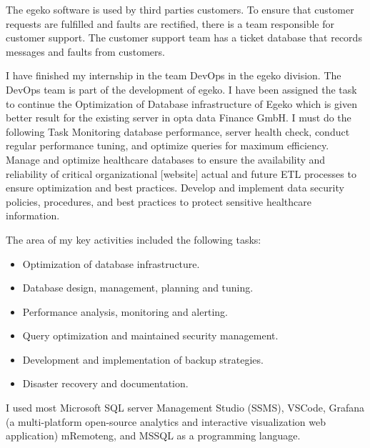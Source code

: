 The egeko software is used by third parties  customers. To ensure that customer requests are fulfilled and faults are rectified, there is a team responsible for customer support. The customer support team has a ticket database that records messages and faults from customers.\vspace{.4cm}

I have finished my internship in the team DevOps in the egeko division. The DevOps team is part of the development of egeko. I have been assigned the task to continue the Optimization of Database infrastructure of Egeko which is given better result for the existing server in opta data Finance GmbH. I must do the following Task Monitoring database performance, server health check, conduct regular performance tuning, and optimize queries for maximum efficiency. Manage and optimize healthcare databases to ensure the availability and reliability of critical organizational [website] actual and future ETL processes to ensure optimization and best practices. Develop and implement data security policies, procedures, and best practices to protect sensitive healthcare information.\vspace{.4cm}

The area of my key activities included the following tasks:
\begin{itemize}
    \item Optimization of database infrastructure.
    \item Database design, management, planning and tuning.
    \item Performance analysis, monitoring and alerting.
    \item Query optimization and maintained security management.
    \item Development and implementation of backup strategies.
    \item Disaster recovery and documentation.
\end{itemize}
I used most Microsoft SQL server Management Studio (SSMS), VSCode, Grafana (a multi-platform open-source analytics and interactive visualization web application) mRemoteng, and MSSQL as a programming language.

